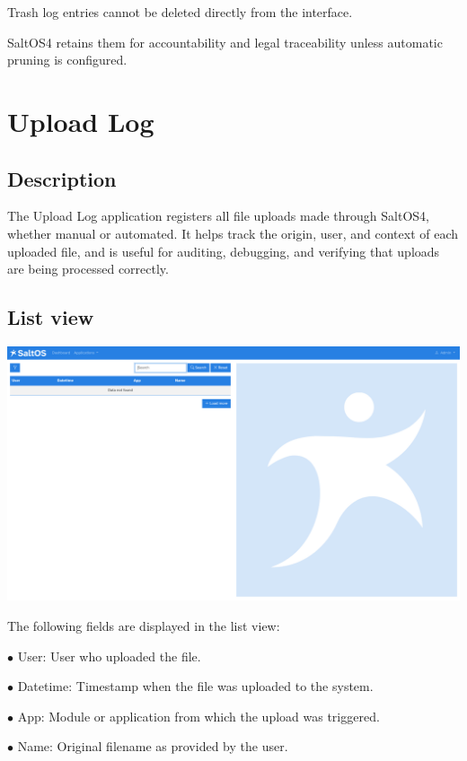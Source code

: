 \documentclass[a4paper]{article}
\begin{document}
Trash log entries cannot be deleted directly from the interface.

SaltOS4 retains them for accountability and legal traceability unless automatic pruning is configured.


\hypertarget{toc36}{}
\section{Upload Log}

\hypertarget{toc37}{}
\subsection{Description}

The Upload Log application registers all file uploads made through SaltOS4, whether manual or automated.
It helps track the origin, user, and context of each uploaded file, and is useful for auditing, debugging,
and verifying that uploads are being processed correctly.

\hypertarget{toc38}{}
\subsection{List view}

\begin{center}\includegraphics[width=1\textwidth]{../ujest/snaps/test-screenshots-js-screenshots-common-uploadlog-list-en-us-1-snap.png}\end{center}

The following fields are displayed in the list view:

\begin{compactitem}
\item[\color{myblue}$\bullet$] User: User who uploaded the file.
\item[\color{myblue}$\bullet$] Datetime: Timestamp when the file was uploaded to the system.
\item[\color{myblue}$\bullet$] App: Module or application from which the upload was triggered.
\item[\color{myblue}$\bullet$] Name: Original filename as provided by the user.
\end{compactitem}
\end{document}
